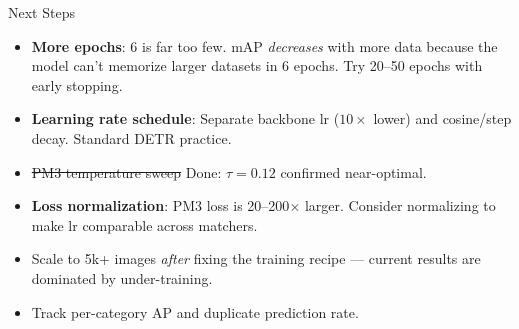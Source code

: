 \documentclass[aspectratio=169]{beamer}
\begin{document}
\begin{frame}{Next Steps}
\small
\begin{itemize}
  \item \textbf{More epochs}: 6 is far too few. mAP \emph{decreases} with more data because the model can't memorize larger datasets in 6 epochs. Try 20--50 epochs with early stopping.
  \item \textbf{Learning rate schedule}: Separate backbone lr ($10\times$ lower) and cosine/step decay. Standard DETR practice.
  \item \sout{PM3 temperature sweep} \textcolor{green!60!black}{Done}: $\tau=0.12$ confirmed near-optimal.
  \item \textbf{Loss normalization}: PM3 loss is 20--200$\times$ larger. Consider normalizing to make lr comparable across matchers.
  \item Scale to 5k+ images \emph{after} fixing the training recipe --- current results are dominated by under-training.
  \item Track per-category AP and duplicate prediction rate.
\end{itemize}
\end{frame}
\end{document}
